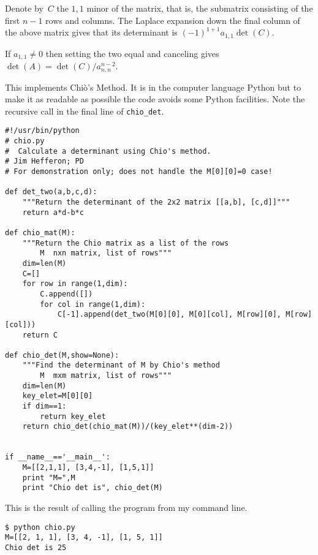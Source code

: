 \begin{exercises}
\begin{answer}
      Denote by~$C$ the $1,1$ minor of the matrix,
      that is, the submatrix consisting of the first $n-1$ rows and columns.
      The Laplace expansion down the final column of the above matrix  
      gives that its determinant is $(-1)^{1+1}a_{1,1}\det(C)$.

      If $a_{1,1}\neq 0$ then setting the two equal and 
      canceling gives $\det(A)=\det(C)/a_{n,n}^{n-2}$.       
    \end{answer}
\end{exercises}

\announcecomputercode
This implements Chi\`o's Method.
It is in the computer language Python but to make it as readable as
possible the code avoids some Python facilities.
Note the recursive call in the final line of 
\lstinline!chio_det!. 
\begin{lstlisting}
#!/usr/bin/python
# chio.py
#  Calculate a determinant using Chio's method.
# Jim Hefferon; PD
# For demonstration only; does not handle the M[0][0]=0 case!

def det_two(a,b,c,d):
    """Return the determinant of the 2x2 matrix [[a,b], [c,d]]"""
    return a*d-b*c

def chio_mat(M):
    """Return the Chio matrix as a list of the rows
        M  nxn matrix, list of rows"""
    dim=len(M)
    C=[]
    for row in range(1,dim):
        C.append([])
        for col in range(1,dim):  
            C[-1].append(det_two(M[0][0], M[0][col], M[row][0], M[row][col]))
    return C

def chio_det(M,show=None):
    """Find the determinant of M by Chio's method
        M  mxm matrix, list of rows"""
    dim=len(M)
    key_elet=M[0][0]
    if dim==1:
        return key_elet
    return chio_det(chio_mat(M))/(key_elet**(dim-2))


if __name__=='__main__':
    M=[[2,1,1], [3,4,-1], [1,5,1]]
    print "M=",M
    print "Chio det is", chio_det(M)
\end{lstlisting}
This is the result of calling the program from my command line.
\begin{lstlisting}
$ python chio.py
M=[[2, 1, 1], [3, 4, -1], [1, 5, 1]]
Chio det is 25
\end{lstlisting}
\endinput
